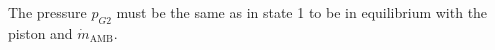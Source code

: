 The pressure \( p_{G2} \) must be the same as in state 1 to be in equilibrium with the piston and \( \dot{m}_{\text{AMB}} \).